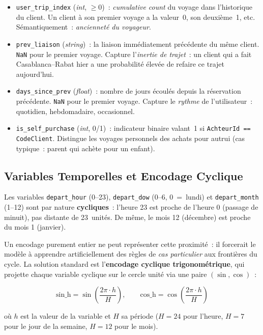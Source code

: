 \documentclass[11pt, a4paper]{article}
\begin{document}
\begin{itemize}
\item \texttt{user\_trip\_index} (\textit{int}, $\geq 0$)~:
    \textit{cumulative count} du voyage dans l'historique du client.
    Un client à son premier voyage a la valeur~0, son deuxième~1, etc.
    Sémantiquement~: \textit{ancienneté du voyageur}.
\item \texttt{prev\_liaison} (\textit{string})~: la liaison immédiatement
    précédente du même client. \texttt{NaN} pour le premier voyage.
    Capture l'\textit{inertie de trajet}~: un client qui a fait
    Casablanca--Rabat hier a une probabilité élevée de refaire ce trajet
    aujourd'hui.
\item \texttt{days\_since\_prev} (\textit{float})~: nombre de jours
    écoulés depuis la réservation précédente. \texttt{NaN} pour le
    premier voyage. Capture le \textit{rythme} de l'utilisateur~:
    quotidien, hebdomadaire, occasionnel.
\item \texttt{is\_self\_purchase} (\textit{int}, 0/1)~: indicateur
    binaire valant~1 si \texttt{AchteurId == CodeClient}. Distingue
    les voyages personnels des achats pour autrui (cas typique~: parent
    qui achète pour un enfant).
\end{itemize}

\subsection{Variables Temporelles et Encodage Cyclique}

Les variables \texttt{depart\_hour} (0--23), \texttt{depart\_dow}
(0--6, 0~=~lundi) et \texttt{depart\_month} (1--12) sont par nature
\textbf{cycliques}~: l'heure 23 est proche de l'heure 0 (passage de
minuit), pas distante de 23~unités. De même, le mois 12 (décembre) est
proche du mois 1 (janvier).

Un encodage purement entier ne peut représenter cette proximité~: il
forcerait le modèle à apprendre artificiellement des règles de
\textit{cas particulier} aux frontières du cycle. La solution standard
est l'\textbf{encodage cyclique trigonométrique}, qui projette chaque
variable cyclique sur le cercle unité via une paire
$(\sin, \cos)$~:

\[
\text{sin\_h} = \sin\!\left(\frac{2\pi \cdot h}{H}\right),\qquad
\text{cos\_h} = \cos\!\left(\frac{2\pi \cdot h}{H}\right)
\]

où $h$ est la valeur de la variable et $H$ sa période ($H = 24$ pour
l'heure, $H = 7$ pour le jour de la semaine, $H = 12$ pour le mois).
\end{document}
